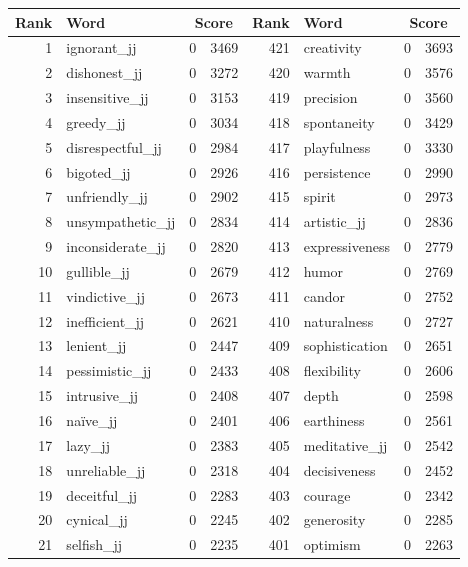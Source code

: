 \begin{table}[tbp]
    \begin{tabular}{| rlr@{.}l | rlr@{.}l |}
    \hline
    \textbf{Rank} & \textbf{Word} & \multicolumn{2}{c|}{\textbf{Score}} & \textbf{Rank} & \textbf{Word} & \multicolumn{2}{c|}{\textbf{Score}} \\
    \hline
    1 & ignorant\_jj & 0 & 3469    &    421 & creativity & 0 & 3693 \\
    2 & dishonest\_jj & 0 & 3272    &    420 & warmth & 0 & 3576 \\
    3 & insensitive\_jj & 0 & 3153    &    419 & precision & 0 & 3560 \\
    4 & greedy\_jj & 0 & 3034    &    418 & spontaneity & 0 & 3429 \\
    5 & disrespectful\_jj & 0 & 2984    &    417 & playfulness & 0 & 3330 \\
    6 & bigoted\_jj & 0 & 2926    &    416 & persistence & 0 & 2990 \\
    7 & unfriendly\_jj & 0 & 2902    &    415 & spirit & 0 & 2973 \\
    8 & unsympathetic\_jj & 0 & 2834    &    414 & artistic\_jj & 0 & 2836 \\
    9 & inconsiderate\_jj & 0 & 2820    &    413 & expressiveness & 0 & 2779 \\
    10 & gullible\_jj & 0 & 2679    &    412 & humor & 0 & 2769 \\
    11 & vindictive\_jj & 0 & 2673    &    411 & candor & 0 & 2752 \\
    12 & inefficient\_jj & 0 & 2621    &    410 & naturalness & 0 & 2727 \\
    13 & lenient\_jj & 0 & 2447    &    409 & sophistication & 0 & 2651 \\
    14 & pessimistic\_jj & 0 & 2433    &    408 & flexibility & 0 & 2606 \\
    15 & intrusive\_jj & 0 & 2408    &    407 & depth & 0 & 2598 \\
    16 & naïve\_jj & 0 & 2401    &    406 & earthiness & 0 & 2561 \\
    17 & lazy\_jj & 0 & 2383    &    405 & meditative\_jj & 0 & 2542 \\
    18 & unreliable\_jj & 0 & 2318    &    404 & decisiveness & 0 & 2452 \\
    19 & deceitful\_jj & 0 & 2283    &    403 & courage & 0 & 2342 \\
    20 & cynical\_jj & 0 & 2245    &    402 & generosity & 0 & 2285 \\
    21 & selfish\_jj & 0 & 2235    &    401 & optimism & 0 & 2263 \\

\end{tabular}
\end{table}
